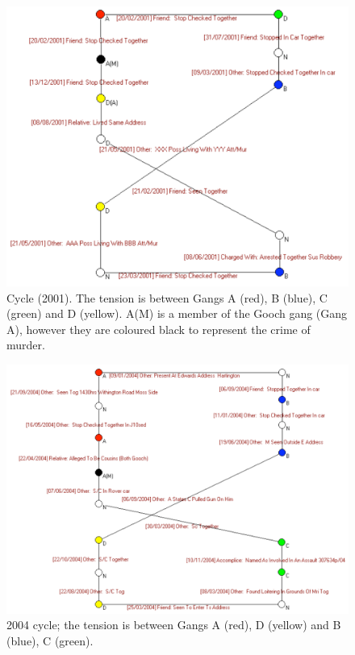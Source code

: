 \documentclass[twocolumn]{svjour3}          %
\theoremstyle{definition}
\begin{document}
\begin{figure}[!htp] 
\centering
\includegraphics[width=\columnwidth]{images/chain2001}
\caption{Cycle (2001). The tension is between Gangs A (red), B (blue),
 C (green) and D (yellow). A(M) is a member of the Gooch gang (Gang A), however they are coloured black to represent the crime of murder.}
\label{fig:chain2001}
\end{figure}


\begin{figure}[!htp] 
\centering
\includegraphics[width=\columnwidth]{images/chain2004}
\caption{2004 cycle; the tension is between Gangs A (red), D (yellow) and B (blue), C (green).}
\label{fig:chain2004}
\end{figure}
\end{document}
